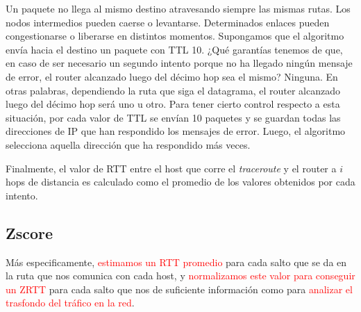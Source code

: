 Un paquete no llega al mismo destino atravesando siempre las mismas rutas. Los nodos intermedios pueden
caerse o levantarse. Determinados enlaces pueden congestionarse o liberarse en distintos momentos.
Supongamos que el algoritmo env\'ia hacia el destino un paquete con TTL 10. ¿Qu\'e garant\'ias tenemos de que,
en caso de ser necesario un segundo intento porque no ha llegado ning\'un mensaje de error, el router
alcanzado luego del d\'ecimo hop sea el mismo? Ninguna. En otras palabras, dependiendo la ruta que siga
el datagrama, el router alcanzado luego del d\'ecimo hop ser\'a uno u otro.
Para tener cierto control respecto a esta situaci\'on, por cada valor de TTL se env\'ian 10 paquetes y
se guardan todas las direcciones de IP que han respondido los mensajes de error.
Luego, el algoritmo selecciona aquella direcci\'on que ha respondido m\'as veces.

Finalmente, el valor de RTT entre el host que corre el \emph{traceroute} y el router a $i$ hops de
distancia es calculado como el promedio de los valores obtenidos por cada intento.

\subsection{Zscore}

M\'as especificamente, \textcolor{red}{estimamos un RTT promedio} para cada salto que se da en
la ruta que nos comunica con cada host, y \textcolor{red}{normalizamos este valor para
conseguir un ZRTT} para cada salto que nos de suficiente informaci\'on como para
\textcolor{red}{analizar el trasfondo del tr\'afico en la red}.

